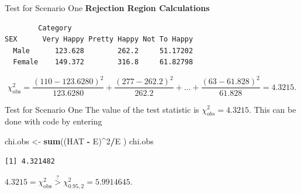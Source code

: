 \documentclass[
  ignorenonframetext,
]{beamer}
\newenvironment{Shaded}{\begin{snugshade}}{\end{snugshade}}
\newcommand{\DecValTok}[1]{\textcolor[rgb]{0.00,0.00,0.81}{#1}}
\newcommand{\FunctionTok}[1]{\textcolor[rgb]{0.13,0.29,0.53}{\textbf{#1}}}
\newcommand{\NormalTok}[1]{#1}
\newcommand{\OtherTok}[1]{\textcolor[rgb]{0.56,0.35,0.01}{#1}}
\newcommand{\SpecialCharTok}[1]{\textcolor[rgb]{0.81,0.36,0.00}{\textbf{#1}}}
\begin{document}
\begin{frame}[fragile]{Test for Scenario One}
\label{test-for-scenario-one-3}
\textbf{Rejection Region Calculations}

\begin{Shaded}
\end{Shaded}

\begin{verbatim}
        Category
SEX      Very Happy Pretty Happy Not To Happy
  Male      123.628        262.2     51.17202
  Female    149.372        316.8     61.82798
\end{verbatim}

\[\chi^2_{\text{obs}}=\frac{(110 - 123.6280)^2}{123.6280} +
\frac{(277-262.2)^2}{262.2}+ \dots +\frac{(63-61.828)^2}{61.828}=4.3215.\]
\end{frame}

\begin{frame}[fragile]{Test for Scenario One}
\label{test-for-scenario-one-4}
The value of the test statistic is \(\chi^2_{obs}=4.3215\). This can be
done with code by entering

\begin{Shaded}
\begin{Highlighting}[]
\NormalTok{chi.obs }\OtherTok{\textless{}{-}} \FunctionTok{sum}\NormalTok{((HAT }\SpecialCharTok{{-}}\NormalTok{ E)}\SpecialCharTok{\^{}}\DecValTok{2}\SpecialCharTok{/}\NormalTok{E )}
\NormalTok{chi.obs}
\end{Highlighting}
\end{Shaded}

\begin{verbatim}
[1] 4.321482
\end{verbatim}

\(4.3215 = \chi^2_{\text{obs}} \overset{?}{>} \chi^2_{0.95,2}= 5.9914645\).
\end{frame}
\end{document}
